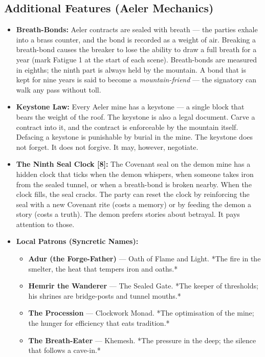 \subsection*{Additional Features (Aeler Mechanics)}
\label{sec:himadri-mechanics}

\begin{itemize}
\item \textbf{Breath-Bonds:} Aeler contracts are sealed with breath — the parties exhale into a brass counter, and the bond is recorded as a weight of air. Breaking a breath-bond causes the breaker to lose the ability to draw a full breath for a year (mark Fatigue 1 at the start of each scene). Breath-bonds are measured in eighths; the ninth part is always held by the mountain. A bond that is kept for nine years is said to become a \textit{mountain-friend} — the signatory can walk any pass without toll.
\item \textbf{Keystone Law:} Every Aeler mine has a keystone — a single block that bears the weight of the roof. The keystone is also a legal document. Carve a contract into it, and the contract is enforceable by the mountain itself. Defacing a keystone is punishable by burial in the mine. The keystone does not forget. It does not forgive. It may, however, negotiate.
\item \textbf{The Ninth Seal Clock [8]:} The Covenant seal on the demon mine has a hidden clock that ticks when the demon whispers, when someone takes iron from the sealed tunnel, or when a breath-bond is broken nearby. When the clock fills, the seal cracks. The party can reset the clock by reinforcing the seal with a new Covenant rite (costs a memory) or by feeding the demon a story (costs a truth). The demon prefers stories about betrayal. It pays attention to those.
\item \textbf{Local Patrons (Syncretic Names):}
  \begin{itemize}
    \item \textbf{Adur (the Forge-Father)} — Oath of Flame and Light. *The fire in the smelter, the heat that tempers iron and oaths.*
    \item \textbf{Hemrir the Wanderer} — The Sealed Gate. *The keeper of thresholds; his shrines are bridge-posts and tunnel mouths.*
    \item \textbf{The Procession} — Clockwork Monad. *The optimisation of the mine; the hunger for efficiency that eats tradition.*
    \item \textbf{The Breath-Eater} — Khemesh. *The pressure in the deep; the silence that follows a cave-in.*
  \end{itemize}
\end{itemize}

